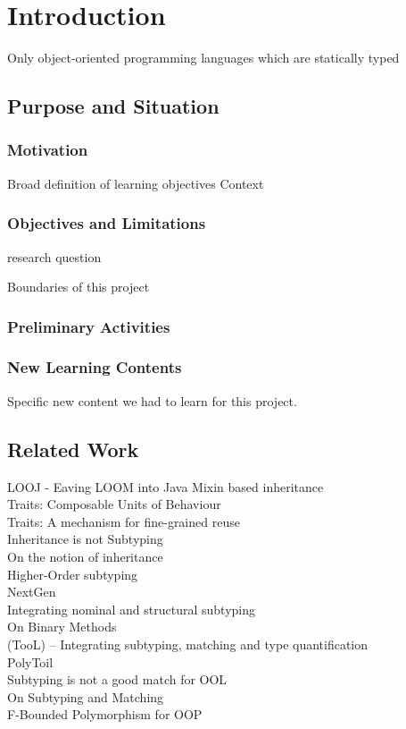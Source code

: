 \chapter{Introduction}
Only object-oriented programming languages which are statically typed

\section{Purpose and Situation}
\subsection{Motivation}
Broad definition of learning objectives
Context

\subsection{Objectives and Limitations}
research question

Boundaries of this project

\subsection{Preliminary Activities}

\subsection{New Learning Contents}
Specific new content we had to learn for this project.

\section{Related Work}
\cite{bruce_looj:_2004} LOOJ - Eaving LOOM into Java
\cite{bracha_mixin-based_1990} Mixin based inheritance \\
\cite{schaerli_traits:_2003} Traits: Composable Units of Behaviour \\
\cite{ducasse_traits:_2006} Traits: A mechanism for fine-grained reuse \\
\cite{cook_inheritance_1990} Inheritance is not Subtyping \\
\cite{taivalsaari_notion_1996} On the notion of inheritance \\
\cite{steffen_higher-order_1994} Higher-Order subtyping \\
\cite{cartwright_compatible_1998} NextGen \\
\cite{malayeri_integrating_2008} Integrating nominal and structural subtyping \\
\cite{bruce_binary_1995} On Binary Methods \\
\cite{gawecki_tool:_1995} (TooL) -- Integrating subtyping, matching and type quantification \\
\cite{bruce_polytoil:_1995} PolyToil \\
\cite{bruce_subtyping_1997} Subtyping is not a good match for OOL \\
\cite{abadi_subtyping_1996} On Subtyping and Matching \\
\cite{canning_f-bounded_1989} F-Bounded Polymorphism for OOP

